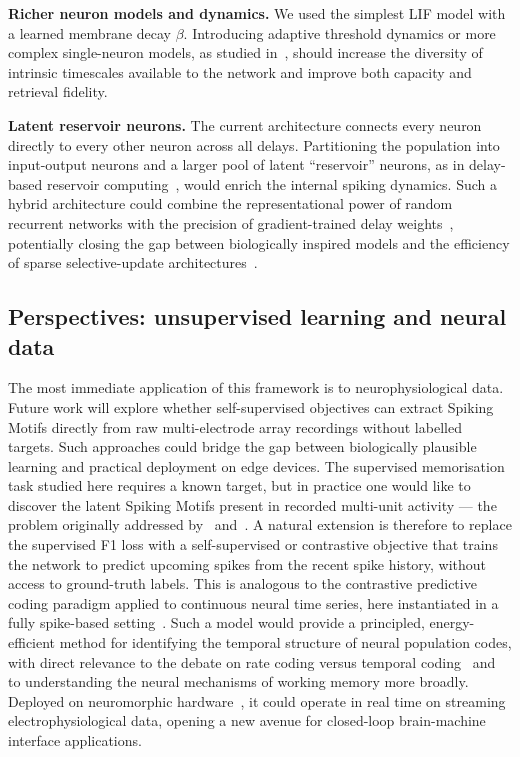 \documentclass{article}
\begin{document}
\textbf{Richer neuron models and dynamics.}
We used the simplest LIF model with a learned membrane decay $\beta$. Introducing adaptive threshold dynamics or more complex single-neuron models, as studied in~\citet{Szatmary2010}, should increase the diversity of intrinsic timescales available to the network and improve both capacity and retrieval fidelity.

\textbf{Latent reservoir neurons.}
The current architecture connects every neuron directly to every other neuron across all delays. Partitioning the population into input-output neurons and a larger pool of latent ``reservoir'' neurons, as in delay-based reservoir computing~\citep{Paugam-Moisy2008}, would enrich the internal spiking dynamics. Such a hybrid architecture could combine the representational power of random recurrent networks with the precision of gradient-trained delay weights~\citep{Neftci2019a}, potentially closing the gap between biologically inspired models and the efficiency of sparse selective-update architectures~\citep{Yin2026}.


\subsection{Perspectives: unsupervised learning and neural data}

The most immediate application of this framework is to neurophysiological data. 
Future work will explore whether self-supervised objectives can extract Spiking Motifs directly from raw multi-electrode array recordings without labelled targets. Such approaches could bridge the gap between biologically plausible learning and practical deployment on edge devices.
The supervised memorisation task studied here requires a known target, but in practice one would like to discover the latent Spiking Motifs present in recorded multi-unit activity --- the problem originally addressed by~\citet{Ikegaya2004} and~\citet{Villette2015}. A natural extension is therefore to replace the supervised F1 loss with a self-supervised or contrastive objective that trains the network to predict upcoming spikes from the recent spike history, without access to ground-truth labels. This is analogous to the contrastive predictive coding paradigm applied to continuous neural time series, here instantiated in a fully spike-based setting~\citep{Grimaldi2023}. Such a model would provide a principled, energy-efficient method for identifying the temporal structure of neural population codes, with direct relevance to the debate on rate coding versus temporal coding~\citep{Softky1993,Bohte2004} and to understanding the neural mechanisms of working memory more broadly. Deployed on neuromorphic hardware~\citep{Goltz2021,Eshraghian2023}, it could operate in real time on streaming electrophysiological data, opening a new avenue for closed-loop brain-machine interface applications.
\end{document}
